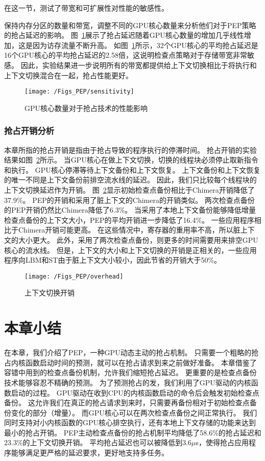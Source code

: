 在这一节，测试了带宽和可扩展性对性能的敏感性。

保持内存分区的数量和带宽，调整不同的GPU核心数量来分析他们对于PEP策略的抢占延迟的影响。
图~\ref{fig:sensitivity}展示了抢占延迟随着GPU核心数量的增加几乎线性增加，这是因为访存流量不断升高。
如图~\ref{fig:sensitivity}所示，32个GPU核心的平均抢占延迟是16个GPU核心的平均抢占延迟的2.58倍，这说明检查点策略对于存储带宽非常敏感。
因此，实验结果进一步说明所有的带宽都提供给上下文切换相比于将执行和上下文切换混合在一起，抢占性能更好。

\begin{figure}[htbp] %
  \centering
  \texttt{[image: /Figs\_PEP/sensitivity]}
  \caption{GPU核心数量对于抢占技术的性能影响}
  \label{fig:sensitivity}
\end{figure}

\subsubsection{抢占开销分析}

本章所指的抢占开销是指由于抢占导致的程序执行的停滞时间。
抢占开销的实验结果如图~\ref{fig:overhead}所示。
当GPU核心在做上下文切换，切换的线程块必须停止取新指令和执行。
GPU核心停滞等待上下文备份和上下文恢复。
上下文备份和上下文恢复的唯一不同是上下文备份前排空流水线的延迟。
因此，我们只比较每个线程块的上下文切换延迟作为开销。
图~\ref{fig:overhead}显示初始检查点备份相比于Chimera开销降低了37.9\%。
PEP的开销和采用了脏上下文的Chimera的开销类似。
两次检查点备份的PEP开销仍然比Chimera降低了6.3\%。
当采用了本地上下文备份能够降低增量检查点备份的上下文大小，PEP的平均开销进一步降低了16.4\%。
一些应用程序相比于Chimera开销可能更高。
在这些情况中，寄存器的重用率不高，所以脏上下文的大小更大。
此外，采用了两次检查点备份，则更多的时间需要用来排空GPU核心的流水线。
但是，上下文的大小和上下文切换的开销是正相关的，一些应用程序向LBM和ST由于脏上下文大小较小，因此节省的开销大于50\%。

\begin{figure}[htbp] %
  \centering
  \texttt{[image: /Figs\_PEP/overhead]}
  \caption{上下文切换开销}
  \label{fig:overhead}
\end{figure}


\section{本章小结}
\label{sec:pepconclusion}
在本章，我们介绍了PEP，一种GPU动态主动的抢占机制。
只需要一个粗略的抢占内核函数启动时间的预测，就可以在抢占请求到来之前做好准备。
本章借鉴了容错中用到的检查点备份机制，允许我们缩短抢占延迟。
更重要的是检查点备份技术能够容忍不精确的预测。
为了预测抢占的发，我们利用了GPU驱动的内核函数启动的过程。
GPU驱动在收到CPU的内核函数启动的命令后会触发初始检查点备份。
这允许我们在真正的抢占请求到来时，只需要再备份相对于初始检查点备份变化的部分（增量）。
而GPU核心可以在两次检查点备份之间正常执行。
我们同时支持对小内核函数的GPU核心排空执行，还有本地上下文存储的功能来达到最小的抢占开销。
PEP主动检查点备份的抢占机制平均降低了58.6\%的抢占延迟和23.3\%的上下文切换开销。
平均抢占延迟也可以被降低到3.6$\mu$s，使得抢占应用程序能够满足更严格的延迟要求，更好地支持多任务。